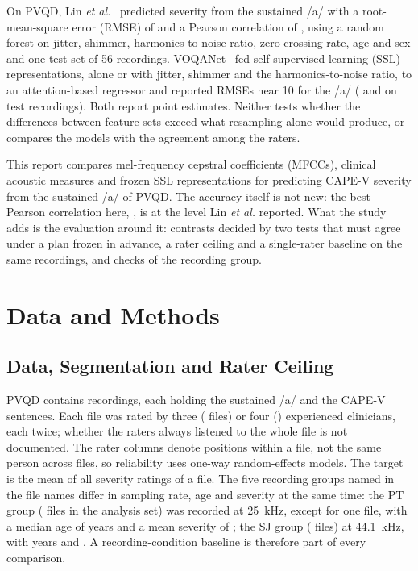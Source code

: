 \documentclass[journal]{IEEEtran}
\begin{document}
On PVQD, Lin \emph{et al.}~\cite{lin2024lightly} predicted severity from the sustained /a/ with a root-mean-square error (RMSE) of \linSeverityRfRmse{} and a Pearson correlation of \linSeverityRfR{}, using a random forest on jitter, shimmer, harmonics-to-noise ratio, zero-crossing rate, age and sex and one test set of 56 recordings. VOQANet~\cite{ariyanti2026voqanet} fed self-supervised learning (SSL) representations, alone or with jitter, shimmer and the harmonics-to-noise ratio, to an attention-based regressor and reported RMSEs near 10 for the /a/ (\vqWhisperRmse{} and \vqWavLMRmse{} on \vqTestFiles{} test recordings). Both report point estimates. Neither tests whether the differences between feature sets exceed what resampling alone would produce, or compares the models with the agreement among the raters.

This report compares mel-frequency cepstral coefficients (MFCCs), clinical acoustic measures and frozen SSL representations for predicting CAPE-V severity from the sustained /a/ of PVQD. The accuracy itself is not new: the best Pearson correlation here, \eoneAfiveR{}, is at the level Lin \emph{et al.} reported. What the study adds is the evaluation around it: \cTotal{} contrasts decided by two tests that must agree under a plan frozen in advance, a rater ceiling and a single-rater baseline on the same recordings, and checks of the recording group.

\section{Data and Methods}\label{sec:methods}

\subsection{Data, Segmentation and Rater Ceiling}
PVQD contains \filesTotal{} recordings, each holding the sustained /a/ and the CAPE-V sentences. Each file was rated by three (\ratersThreeFiles{} files) or four (\ratersFourFiles{}) experienced clinicians, each twice; whether the raters always listened to the whole file is not documented. The rater columns denote positions within a file, not the same person across files, so reliability uses one-way random-effects models. The target is the mean of all severity ratings of a file. The five recording groups named in the file names differ in sampling rate, age and severity at the same time: the PT group (\samplePTN{} files in the analysis set) was recorded at 25~kHz, except for one file, with a median age of \samplePTAge{} years and a mean severity of \samplePTSeverity{}; the SJ group (\sampleSJN{} files) at 44.1~kHz, with \sampleSJAge{} years and \sampleSJSeverity{}. A recording-condition baseline is therefore part of every comparison.
\end{document}
